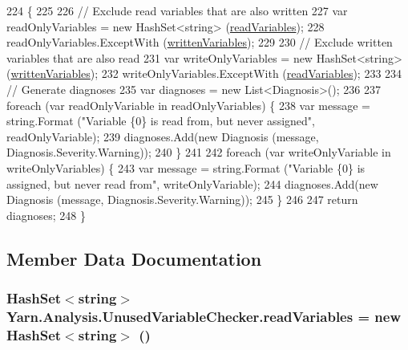 \begin{DoxyCode}
224         \{
225 
226             \textcolor{comment}{// Exclude read variables that are also written}
227             var readOnlyVariables = \textcolor{keyword}{new} HashSet<string> (\hyperlink{a00175_a6b542092ddce1b92c9455d60899518a9}{readVariables});
228             readOnlyVariables.ExceptWith (\hyperlink{a00175_a0c2fe6eded1b10b135ca2469f5980a39}{writtenVariables});
229 
230             \textcolor{comment}{// Exclude written variables that are also read}
231             var writeOnlyVariables = \textcolor{keyword}{new} HashSet<string> (\hyperlink{a00175_a0c2fe6eded1b10b135ca2469f5980a39}{writtenVariables});
232             writeOnlyVariables.ExceptWith (\hyperlink{a00175_a6b542092ddce1b92c9455d60899518a9}{readVariables});
233 
234             \textcolor{comment}{// Generate diagnoses}
235             var diagnoses = \textcolor{keyword}{new} List<Diagnosis>();
236 
237             \textcolor{keywordflow}{foreach} (var readOnlyVariable \textcolor{keywordflow}{in} readOnlyVariables) \{
238                 var message = string.Format (\textcolor{stringliteral}{"Variable \{0\} is read from, but never assigned"}, 
      readOnlyVariable);
239                 diagnoses.Add(\textcolor{keyword}{new} Diagnosis (message, Diagnosis.Severity.Warning));
240             \}
241 
242             \textcolor{keywordflow}{foreach} (var writeOnlyVariable \textcolor{keywordflow}{in} writeOnlyVariables) \{
243                 var message = string.Format (\textcolor{stringliteral}{"Variable \{0\} is assigned, but never read from"}, 
      writeOnlyVariable);
244                 diagnoses.Add(\textcolor{keyword}{new} Diagnosis (message, Diagnosis.Severity.Warning));
245             \}
246 
247             \textcolor{keywordflow}{return} diagnoses;
248         \}
\end{DoxyCode}


\subsection{Member Data Documentation}
\hypertarget{a00175_a6b542092ddce1b92c9455d60899518a9}{
\subsubsection[{read\-Variables}]{\setlength{\rightskip}{0pt plus 5cm}Hash\-Set$<$string$>$ Yarn.\-Analysis.\-Unused\-Variable\-Checker.\-read\-Variables = new Hash\-Set$<$string$>$ ()\hspace{0.3cm}{\ttfamily [private]}}}\label{a00175_a6b542092ddce1b92c9455d60899518a9}


